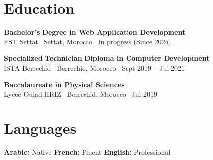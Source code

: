 \documentclass[10pt,a4paper]{article}
\begin{document}
\section*{Education}
{\small \textbf{Bachelor's Degree in Web Application Development}}\\
{\small FST Settat \textbar\ Settat, Morocco \textbar\ In progress (Since 2025)}

\vspace{4pt}

{\small \textbf{Specialized Technician Diploma in Computer Development}}\\
{\small ISTA Berrechid \textbar\ Berrechid, Morocco \textbar\ Sept 2019 -- Jul 2021}

\vspace{4pt}

{\small \textbf{Baccalaureate in Physical Sciences}}\\
{\small Lycee Oulad HRIZ \textbar\ Berrechid, Morocco \textbar\ Jul 2019}

\section*{Languages}
{\small \textbf{Arabic:} Native \quad\textbar\quad \textbf{French:} Fluent \quad\textbar\quad \textbf{English:} Professional}
\end{document}
